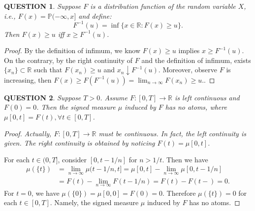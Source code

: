 \documentclass[12pt]{article}
\renewcommand{\(}{\left(}%
\renewcommand{\)}{\right)}%
\renewcommand{\[}{\left[}%
\renewcommand{\]}{\right]}%
\renewcommand{\r}{\mathbb{R}}
\newcommand{\p}{\mathbb{P}}
\newtheorem{question}{QUESTION}[section]}
\newtheorem{proof}{Proof.}}
\begin{document}
  \begin{question}
   Suppose $F$ is a distribution function of the random variable $X$, i.e., $F(x)=\p(-\infty,x] $ and define:
   \begin{equation*}
    F^{-1}(u)=\inf\{x\in\r:F(x)\geq u \}.
   \end{equation*}
   Then $F(x)\geq u$ iff $x\geq F^{-1}(u)$.
  \end{question}
  \begin{proof}
   By the definition of infimum, we know $F(x)\geq u$ implies $x\geq F^{-1}(u)$. On the contrary, by the right continuity of $F$ and the definition of infimum, exists $\{x_n\}\subset\r$ such that $F(x_n)\geq u$ and $x_n\downarrow F^{-1}(u)$. Moreover, observe $F$ is increasing, then $F(x)\geq F(F^{-1}(u))=\lim_{n\to\infty}F(x_n)\geq u.$.
  \end{proof}

  \begin{question}
   Suppose $T>0$. Assume $F:[0,T]\to \r$ is left continuous and $F(0)=0$. Then the signed measure $\mu$ induced by $F$ has no atoms, where $\mu[0,t]=F(t),\forall t\in[0,T]$.
  \end{question}
  \begin{proof}
   {\itshape Actually, $F:[0,T]\to \r$ must be continuous. In fact, the left continuity is given. The right continuity is obtained by noticing $F(t)=\mu[0,t]$.}

   For each $t\in(0,T]$, consider $[0,t-1/n]$ for $n>1/t$. Then we have
   \begin{equation*}
    \begin{split}
     \mu(\{t\})&=\lim_{n\to\infty}\mu(t-1/n,t]=\mu[0,t]-\lim_{n\to\infty}\mu[0,t-1/n] \\
     &=F(t)-\lim_{n\to\infty}F(t-1/n)=F(t)-F(t-)=0.
    \end{split}
   \end{equation*}
   For $t=0$, we have $\mu(\{0\})=\mu[0,0]=F(0)=0$. Therefore $\mu(\{t\})=0$ for each $t\in[0,T]$. Namely, the signed measure $\mu$ induced by $F$ has no atoms.
  \end{proof}
\end{document}
